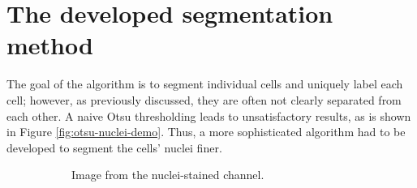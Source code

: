 \documentclass[
  digital,     %
  oneside,     %
  nosansbold,  %
  nocolorbold, %
  lof,         %
  lot,         %
]{fithesis4}
\begin{document}
\chapter{The developed segmentation method}
The goal of the algorithm is to segment individual cells and uniquely label each
cell; however, as previously discussed, they are often not clearly separated
from each other. A naive Otsu thresholding leads to unsatisfactory results, as is
shown in Figure \ref{fig:otsu-nuclei-demo}. Thus, a more sophisticated algorithm
had to be developed to segment the cells' nuclei finer.
\begin{figure}
    \begin{subfigure}[t]{0.45\textwidth}
        \centering
        \caption{Image from the nuclei-stained channel.}
    \end{subfigure}
    \hfill
    \begin{subfigure}[t]{0.45\textwidth}
        \centering

\end{subfigure}
\end{figure}
\end{document}
